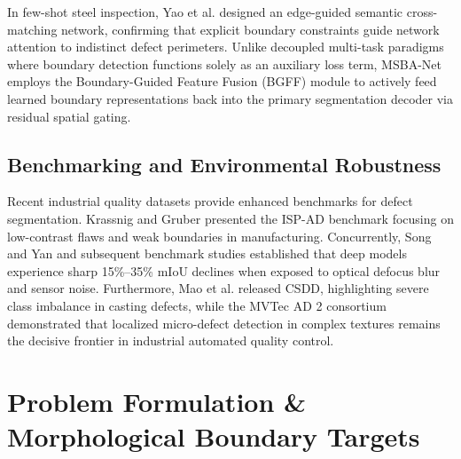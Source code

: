 \documentclass{ieeeaccess}
\begin{document}
In few-shot steel inspection, Yao et al. \cite{yao2024fewshot} designed an edge-guided semantic cross-matching network, confirming that explicit boundary constraints guide network attention to indistinct defect perimeters. Unlike decoupled multi-task paradigms where boundary detection functions solely as an auxiliary loss term, MSBA-Net employs the Boundary-Guided Feature Fusion (BGFF) module to actively feed learned boundary representations back into the primary segmentation decoder via residual spatial gating.

\subsection{Benchmarking and Environmental Robustness}
Recent industrial quality datasets provide enhanced benchmarks for defect segmentation. Krassnig and Gruber \cite{krassnig2025ispad} presented the ISP-AD benchmark focusing on low-contrast flaws and weak boundaries in manufacturing. Concurrently, Song and Yan \cite{song2013neu} and subsequent benchmark studies established that deep models experience sharp 15\%--35\% mIoU declines when exposed to optical defocus blur and sensor noise. Furthermore, Mao et al. \cite{mao2025csdd} released CSDD, highlighting severe class imbalance in casting defects, while the MVTec AD 2 consortium \cite{hecklerkram2025mvtecad2} demonstrated that localized micro-defect detection in complex textures remains the decisive frontier in industrial automated quality control.

\section{Problem Formulation \& Morphological Boundary Targets}
\label{sec:problem_statement}
\end{document}
